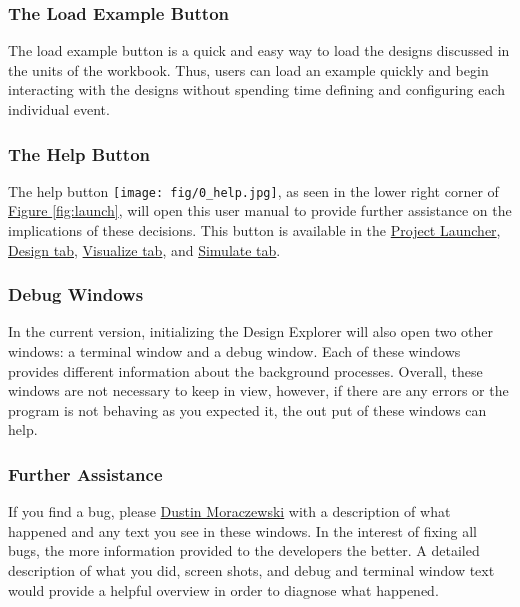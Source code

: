 \documentclass[10pt]{article}
\renewcommand{\thesubsection}{}
\newcommand*{\hbut}{\texttt{[image: fig/0\_help.jpg]}}
\begin{document}
		\subsubsection*{The Load Example Button}
		\label{subsubsec:example}
			The load example button is a quick and easy way to load the designs discussed in the units of the workbook.
			Thus, users can load an example quickly and begin interacting with the designs without spending time defining and configuring each individual event.
		\subsubsection*{The Help Button}
		\label{subsubsec:hbut}
			The help button \hbut{}, as seen in the lower right corner of \hyperref[fig:launch]{Figure \ref{fig:launch}}, will open this user manual to provide further assistance on the implications of these decisions.
			This button is available in the \hyperref[fig:launch]{Project Launcher}, \hyperref[subsubsec:design]{Design tab}, \hyperref[subsubsec:visualize]{Visualize tab}, and \hyperref[subsubsec:simulate]{Simulate tab}.

		\subsubsection*{Debug Windows}
		\label{subsubsec:debug}
			In the current version, initializing the Design Explorer will also open two other windows: a terminal window and a debug window.
			Each of these windows provides different information about the background processes.
			Overall, these windows are not necessary to keep in view, however, if there are any errors or the program is not behaving as you expected it, the out put of these windows can help.

		\subsubsection*{Further Assistance}
		\label{subsubsec:furtherhelp}
			If you find a bug, please \href{mailto:dmoracze@umd.edu}{Dustin Moraczewski} with a description of what happened and any text you see in these windows.
			In the interest of fixing all bugs, the more information provided to the developers the better.
			A detailed description of what you did, screen shots, and debug and terminal window text would provide a helpful overview in order to diagnose what happened.
\newpage

\renewcommand{\thesubsection}{\arabic{section}.\arabic{subsection}}
\end{document}
